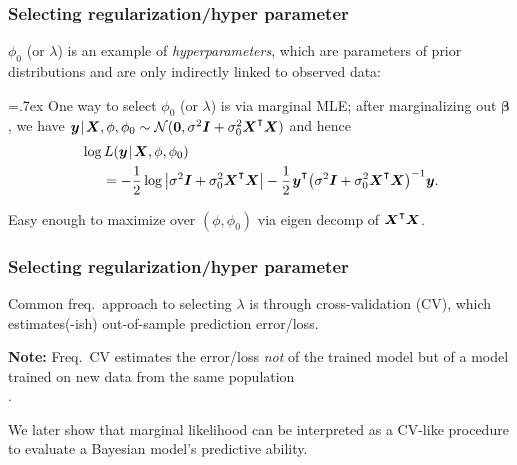 \documentclass[18pt]{beamer}
\newcommand{\defineTightSpacing}{%
	\setlength{\abovedisplayskip}{.25\baselineskip}%
	\setlength{\belowdisplayskip}{.25\baselineskip}%
}
\renewcommand{\textsc}[1]{{\small \MakeUppercase{#1}}}
\newcommand{\given}{\thinnerspace | \thinnerspace}
\newcommand{\transpose}{\text{\raisebox{.5ex}{$\intercal$}}}
\newcommand{\thinnerspace}{\mskip.5\thinmuskip}
\newcommand{\normalDist}{\mathcal{N}}
\newcommand{\likelihood}{L}
\newcommand{\by}{\bm{y}}
\newcommand{\bX}{\bm{X}}
\newcommand{\bbeta}{\bm{\beta}}
\newcommand{\Id}{\bm{I}}
\begin{document}
\begin{frame}
\frametitle{Selecting regularization/hyper parameter}
$\phi_0$ (or $\lambda$) is an example of \textit{hyperparameters}, which are parameters of prior distributions and are only indirectly linked to observed data:%
\vspace*{-.3\baselineskip}
\begin{figure} 
\end{figure}
\vspace*{-.7\baselineskip}

\pause
{\font=.7ex 
One way to select $\phi_0$ (or $\lambda$) is via marginal \textsc{MLE};
\pause
after marginalizing out $\bbeta$, we have $\thinnerspace \by \given \bX, \phi, \phi_0 \sim \normalDist(\bm{0}, \sigma^2 \Id + \sigma_0^2 \bX^\transpose \bX)$ and hence}
\begin{equation*} \defineTightSpacing%
\begin{aligned}
&\log \likelihood(\by \given \bX, \phi, \phi_0)\\
&\hspace*{1.5em}= - \frac12 \log \left| \sigma^2 \Id + \sigma_0^2 \bX^\transpose \bX \right|
	- \frac12 \thinnerspace \by^\transpose \! \left( \sigma^2 \Id + \sigma_0^2 \bX^\transpose \bX \right)^{-1}\! \by.
\end{aligned}
\end{equation*}

\pause
Easy enough to maximize over $(\phi, \phi_0)$ via eigen decomp of $\bX^\transpose \bX$.
\end{frame}


\begin{frame}
\frametitle{Selecting regularization/hyper parameter}
Common freq.\ approach to selecting $\lambda$ is through cross-validation (\textsc{CV}), which estimates(-ish) out-of-sample prediction error/loss.

\pause
\smallskip
\textbf{Note:} Freq.\ \textsc{CV} estimates the error/loss \textit{not} of the trained model but of a model trained on new data from the same population\\
\hfill \citep{hastie2009esl, bates2023cross_validation}.

\pause
\smallskip
We later show that marginal likelihood can be interpreted as a \textsc{CV}-like procedure to evaluate a Bayesian model's predictive ability.
\end{frame}
\end{document}
